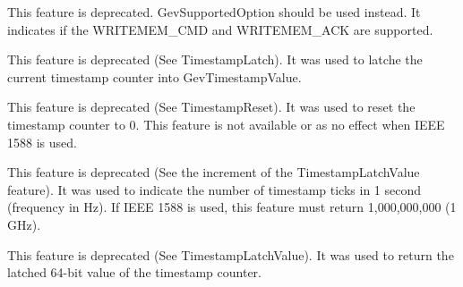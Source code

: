 \begin{DoxyRefList}
\item[\label{deprecated__deprecated000075}%
\hypertarget{deprecated__deprecated000075}{}%
成员 \hyperlink{classmv_i_m_p_a_c_t_1_1acquire_1_1_gen_i_cam_1_1_transport_layer_control_a07c5096c618fdce89f909b513d93dd30}{mv\+I\+M\+P\+A\+C\+T\+:\+:acquire\+:\+:Gen\+I\+Cam\+:\+:Transport\+Layer\+Control\+:\+:gev\+Supported\+Optional\+Commands\+W\+R\+I\+T\+E\+M\+E\+M} ]This feature is deprecated. Gev\+Supported\+Option should be used instead. It indicates if the W\+R\+I\+T\+E\+M\+E\+M\+\_\+\+C\+M\+D and W\+R\+I\+T\+E\+M\+E\+M\+\_\+\+A\+C\+K are supported.  
\item[\label{deprecated__deprecated000079}%
\hypertarget{deprecated__deprecated000079}{}%
成员 \hyperlink{classmv_i_m_p_a_c_t_1_1acquire_1_1_gen_i_cam_1_1_transport_layer_control_a57adc9d8ec47465e1f2dc1e1807517e2}{mv\+I\+M\+P\+A\+C\+T\+:\+:acquire\+:\+:Gen\+I\+Cam\+:\+:Transport\+Layer\+Control\+:\+:gev\+Timestamp\+Control\+Latch} ]This feature is deprecated (See Timestamp\+Latch). It was used to latche the current timestamp counter into Gev\+Timestamp\+Value.  
\item[\label{deprecated__deprecated000080}%
\hypertarget{deprecated__deprecated000080}{}%
成员 \hyperlink{classmv_i_m_p_a_c_t_1_1acquire_1_1_gen_i_cam_1_1_transport_layer_control_a8756dbc39c18e2b1c21afd9d5a2eb68d}{mv\+I\+M\+P\+A\+C\+T\+:\+:acquire\+:\+:Gen\+I\+Cam\+:\+:Transport\+Layer\+Control\+:\+:gev\+Timestamp\+Control\+Reset} ]This feature is deprecated (See Timestamp\+Reset). It was used to reset the timestamp counter to 0. This feature is not available or as no effect when I\+E\+E\+E 1588 is used.  
\item[\label{deprecated__deprecated000078}%
\hypertarget{deprecated__deprecated000078}{}%
成员 \hyperlink{classmv_i_m_p_a_c_t_1_1acquire_1_1_gen_i_cam_1_1_transport_layer_control_a2cd5a80f9d9c41abb2fb4d46dfd1db74}{mv\+I\+M\+P\+A\+C\+T\+:\+:acquire\+:\+:Gen\+I\+Cam\+:\+:Transport\+Layer\+Control\+:\+:gev\+Timestamp\+Tick\+Frequency} ]This feature is deprecated (See the increment of the Timestamp\+Latch\+Value feature). It was used to indicate the number of timestamp ticks in 1 second (frequency in Hz). If I\+E\+E\+E 1588 is used, this feature must return 1,000,000,000 (1 G\+Hz).  
\item[\label{deprecated__deprecated000081}%
\hypertarget{deprecated__deprecated000081}{}%
成员 \hyperlink{classmv_i_m_p_a_c_t_1_1acquire_1_1_gen_i_cam_1_1_transport_layer_control_afdf9e13e89c38f15b6bbc80976f14cbe}{mv\+I\+M\+P\+A\+C\+T\+:\+:acquire\+:\+:Gen\+I\+Cam\+:\+:Transport\+Layer\+Control\+:\+:gev\+Timestamp\+Value} ]This feature is deprecated (See Timestamp\+Latch\+Value). It was used to return the latched 64-\/bit value of the timestamp counter.  

\end{DoxyRefList}
